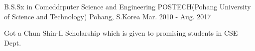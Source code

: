 

\begin{cventries}

  \cventry
    {B.S.Sx in Comcddrputer Science and Engineering} %
    {POSTECH(Pohang University of Science and Technology)} %
    {Pohang, S.Korea} %
    {Mar. 2010 - Aug. 2017} %
    {
      \begin{cvitems} %
        \item {Got a Chun Shin-Il Scholarship which is given to promising students in CSE Dept.}
      \end{cvitems}
    }

\end{cventries}
